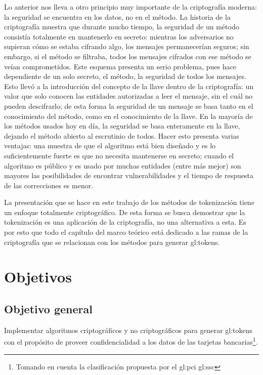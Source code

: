 Lo anterior nos lleva a otro principio muy importante de la criptografía
moderna: la seguridad se encuentra en los datos, no en el método. La historia
de la criptografía muestra que durante mucho tiempo, la seguridad de un método
consistía totalmente en mantenerlo en secreto: mientras los adversarios
no supieran cómo se estaba cifrando algo, los mensajes permanecerían seguros;
sin embargo, si el método se filtraba, todos los mensajes cifrados con ese
método se veían comprometidos. Este esquema presenta un serio problema,
pues hace dependiente de un solo secreto, el método, la seguridad de todos
los mensajes. Esto llevó a la introducción del concepto de la llave dentro
de la criptografía: un valor que solo conocen las entidades autorizadas a leer
el mensaje, sin el cuál no pueden descifrarlo; de esta forma la seguridad de un
mensaje se basa tanto en el conocimiento del método, como en el conocimiento
de la llave. En la mayoría de los métodos usados hoy en día, la seguridad se
basa enteramente en la llave, dejando el método abierto al escrutinio de todos.
Hacer esto presenta varias ventajas: una muestra de que el algoritmo está
bien diseñado y es lo suficientemente fuerte es que no necesita mantenerse en
secreto; cuando el algoritmo es público y es usado por muchas entidades (entre
más mejor) son mayores las posibilidades de encontrar vulnerabilidades y
el tiempo de respuesta de las correcciones es menor.

La presentación que se hace en este trabajo de los métodos de tokenización
tiene un enfoque totalmente criptográfico. De esta forma se busca demostrar
que la tokenización es una aplicación de la criptografía, no una alternativa
a esta. Es por esto que todo el capítulo del marco teórico está dedicado a las
ramas de la criptografía que se relacionan con los métodos para generar
\glspl{gl:token}.

\section{Objetivos}

\subsection{Objetivo general}

Implementar algoritmos criptográficos y no criptográficos para generar
\glspl{gl:token} con el propósito de proveer confidencialidad a los datos de las
tarjetas bancarias\footnote{Tomando en cuenta la clasificación propuesta por el
\gls{gl:pci} \gls{gl:ssc}}.

